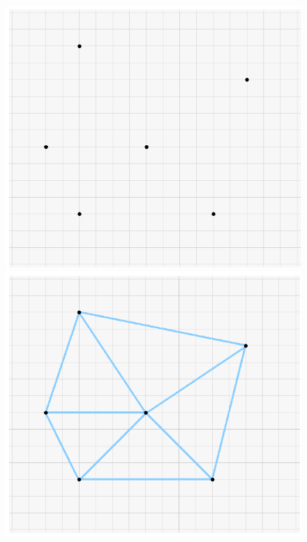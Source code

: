 \begin{figure}[H]
    \centering
    \begin{minipage}{0.49\columnwidth}
        \includegraphics[width=\columnwidth]{images/semaine13_maillage1.png}
    \end{minipage}\hfill
    \begin{minipage}{0.49\columnwidth}
        \includegraphics[width=\columnwidth]{images/semaine13_maillage2.png}

\end{minipage}
\end{figure}
